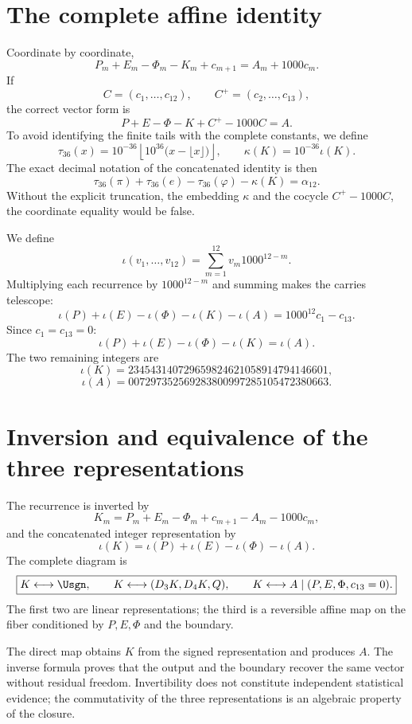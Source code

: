 \section{The complete affine identity}

Coordinate by coordinate,
\[
\boxed{
P_m+E_m-\Phi_m-K_m+c_{m+1}
=A_m+1000c_m.}
\]
If
\[
C=(c_1,\ldots,c_{12}),
\qquad
C^+=(c_2,\ldots,c_{13}),
\]
the correct vector form is
\[
\boxed{P+E-\Phi-K+C^+-1000C=A.}
\]
To avoid identifying the finite tails with the complete constants,
we define
\[
 \tau_{36}(x)=10^{-36}\left\lfloor10^{36}
 \bigl(x-\lfloor x\rfloor\bigr)\right\rfloor,
 \qquad
 \kappa(K)=10^{-36}\iota(K).
\]
The exact decimal notation of the concatenated identity is then
\[
 \tau_{36}(\pi)+\tau_{36}(e)-\tau_{36}(\varphi)-\kappa(K)
 =\alpha_{12}.
\]
Without the explicit truncation, the embedding \(\kappa\) and the cocycle
\(C^+-1000C\), the coordinate equality would be false.

We define
\[
\iota(v_1,\ldots,v_{12})
=\sum_{m=1}^{12}v_m1000^{12-m}.
\]
Multiplying each recurrence by \(1000^{12-m}\) and summing makes the carries
telescope:
\[
\iota(P)+\iota(E)-\iota(\Phi)-\iota(K)-\iota(A)
=1000^{12}c_1-c_{13}.
\]
Since \(c_1=c_{13}=0\):
\[
\boxed{
\iota(P)+\iota(E)-\iota(\Phi)-\iota(K)=\iota(A).}
\]
The two remaining integers are
\[
\iota(K)=234543140729659824621058914794146601,
\]
\[
\iota(A)=007297352569283800997285105472380663.
\]

\section{Inversion and equivalence of the three representations}

The recurrence is inverted by
\[
K_m=P_m+E_m-\Phi_m+c_{m+1}-A_m-1000c_m,
\]
and the concatenated integer representation by
\[
\iota(K)=\iota(P)+\iota(E)-\iota(\Phi)-\iota(A).
\]
The complete diagram is
\[
\boxed{
K\longleftrightarrow\Usgn,
\qquad
K\longleftrightarrow(D_3K,D_4K,Q),
\qquad
K\longleftrightarrow A\mid(P,E,\Phi,c_{13}=0).}
\]
The first two are linear representations; the third is a reversible affine
map on the fiber
conditioned by \(P,E,\Phi\) and the boundary.

\begin{remark}
The direct map obtains \(K\) from the signed representation and produces
\(A\). The inverse formula proves that the output and the boundary recover the
same vector without residual freedom. Invertibility does not constitute
independent statistical evidence; the commutativity of the three
representations is an algebraic property of the closure.
\end{remark}

